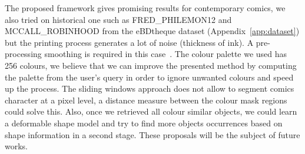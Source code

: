 % 





The proposed framework gives promising results for contemporary comics, we also tried on historical one such as FRED\_PHILEMON12 and MCCALL\_ROBINHOOD from the eBDtheque dataset (Appendix~\ref{app:dataset}) but the printing process generates a lot of noise (thickness of ink). 
A pre-processing smoothing is required in this case~\cite{l0smoothing2011,Kopf2012DigitalReconstruction}.
The colour palette we used has 256 colours, we believe that we can improve the presented method by computing the palette from the user's query in order to ignore unwanted colours and speed up the process.
The sliding windows approach does not allow to segment comics character at a pixel level, a distance measure between the colour mask regions could solve this.
Also, once we retrieved all colour similar objects, we could learn a deformable shape model and try to find more objects occurrences based on shape information in a second stage.
These proposals will be the subject of future works.

